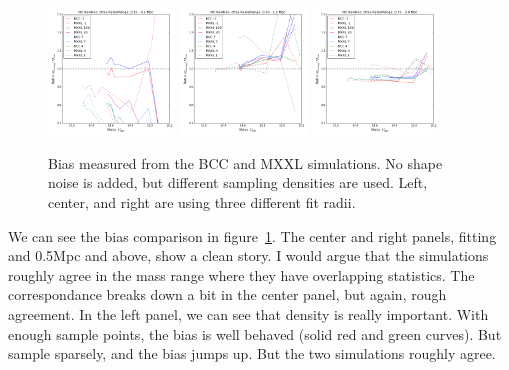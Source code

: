 \documentclass[11pt]{article}
\begin{document}
\begin{figure} \centering
\includegraphics[width=0.3\textwidth]{figures/density_cfree-r1}
\includegraphics[width=0.3\textwidth]{figures/density_cfree-r5}
\includegraphics[width=0.3\textwidth]{figures/density_cfree-r10}
\caption{Bias measured from the BCC and MXXL simulations. No shape noise is added, but different sampling densities are used. Left, center, and right are using three different fit radii.}
\label{fig:bcc_vs_mxxl_density}
\end{figure}

We can see the bias comparison in figure~\ref{fig:bcc_vs_mxxl_density}. The center and right panels, fitting and 0.5Mpc and above, show a clean story. I would argue that the simulations roughly agree in the mass range where they have overlapping statistics. The correspondance breaks down a bit in the center panel, but again, rough agreement. In the left panel, we can see that density is really important. With enough sample points, the bias is well behaved (solid red and green curves). But sample sparsely, and the bias jumps up. But the two simulations roughly agree.
\end{document}
